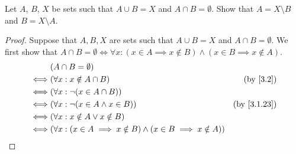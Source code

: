 \begin{exercise}\label{ex 3.1.9}
  Let \(A\), \(B\), \(X\) be sets such that \(A \cup B = X\) and \(A \cap B = \emptyset\).
  Show that \(A = X \setminus B\) and \(B = X \setminus A\).
\end{exercise}

\begin{proof}
  Suppose that \(A, B, X\) are sets such that \(A \cup B = X\) and \(A \cap B = \emptyset\).
  We first show that \(A \cap B = \emptyset \iff \forall x : (x \in A \implies x \notin B) \land (x \in B \implies x \notin A)\).
  \begin{align*}
         & (A \cap B = \emptyset)                                                                                      \\
    \iff & (\forall x : x \notin A \cap B)                                                 & \text{(by \cref{3.2})}    \\
    \iff & (\forall x : \lnot (x \in A \cap B))                                                                        \\
    \iff & (\forall x : \lnot (x \in A \land x \in B))                                     & \text{(by \cref{3.1.23})} \\
    \iff & (\forall x : x \notin A \lor x \notin B)                                                                    \\
    \iff & (\forall x : (x \in A \implies x \notin B) \land (x \in B \implies x \notin A))                             \\
  \end{align*}


\end{proof}
